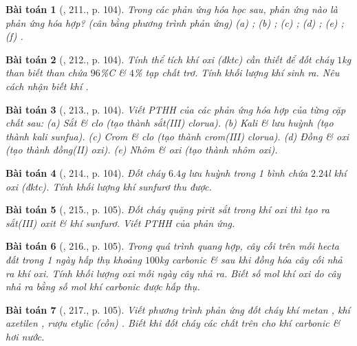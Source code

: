 \documentclass{article}
\newtheorem{baitoan}{Bài toán}
\begin{document}
\begin{baitoan}[\cite{An_400_BT_Hoa_Hoc_8_2020}, 211., p. 104]
	Trong các phản ứng hóa học sau, phản ứng nào là phản ứng hóa hợp? (cân bằng phương trình phản ứng) (a) \emph{}; (b) \emph{}; (c) \emph{}; (d) \emph{}; (e) \emph{}; (f) \emph{}.
\end{baitoan}

\begin{baitoan}[\cite{An_400_BT_Hoa_Hoc_8_2020}, 212., p. 104]
	Tính thể tích khí oxi (đktc) cần thiết để đốt cháy $1$\emph{kg} than biết than chứa $96$\%\emph{C} \& $4$\% tạp chất trơ. Tính khối lượng khí \emph{} sinh ra. Nêu cách nhận biết khí \emph{}.
\end{baitoan}

\begin{baitoan}[\cite{An_400_BT_Hoa_Hoc_8_2020}, 213., p. 104]
	Viết PTHH của các phản ứng hóa hợp của từng cặp chất sau: (a) Sắt \& clo (tạo thành sắt(III) clorua). (b) Kali \& lưu huỳnh (tạo thành kali sunfua). (c) Crom \& clo (tạo thành crom(III) clorua). (d) Đồng \& oxi (tạo thành đồng(II) oxi). (e) Nhôm \& oxi (tạo thành nhôm oxi).
\end{baitoan}

\begin{baitoan}[\cite{An_400_BT_Hoa_Hoc_8_2020}, 214., p. 104]
	Đốt cháy $6.4$\emph{g} lưu huỳnh trong 1 bình chứa $2.24$\emph{l} khí oxi (đktc). Tính khối lượng khí sunfurơ \emph{} thu được.
\end{baitoan}

\begin{baitoan}[\cite{An_400_BT_Hoa_Hoc_8_2020}, 215., p. 105]
	Đốt cháy quặng pirit sắt \emph{} trong khí oxi thì tạo ra sắt(III) oxit \& khí sunfurơ. Viết PTHH của phản ứng.
\end{baitoan}

\begin{baitoan}[\cite{An_400_BT_Hoa_Hoc_8_2020}, 216., p. 105]
	Trong quá trình quang hợp, cây cối trên mỗi hecta đất trong 1 ngày hấp thụ khoảng $100$\emph{kg} carbonic \& sau khi đồng hóa cây cối nhả ra khí oxi. Tính khối lượng oxi mỗi ngày cây nhả ra. Biết số mol khí oxi do cây nhả ra bằng số mol khí carbonic được hấp thụ.
\end{baitoan}

\begin{baitoan}[\cite{An_400_BT_Hoa_Hoc_8_2020}, 217., p. 105]
	Viết phương trình phản ứng đốt cháy khí metan \emph{}, khí axetilen \emph{}, rượu etylic (cồn) \emph{}. Biết khi đốt cháy các chất trên cho khí carbonic \& hơi nước.
\end{baitoan}
\end{document}
